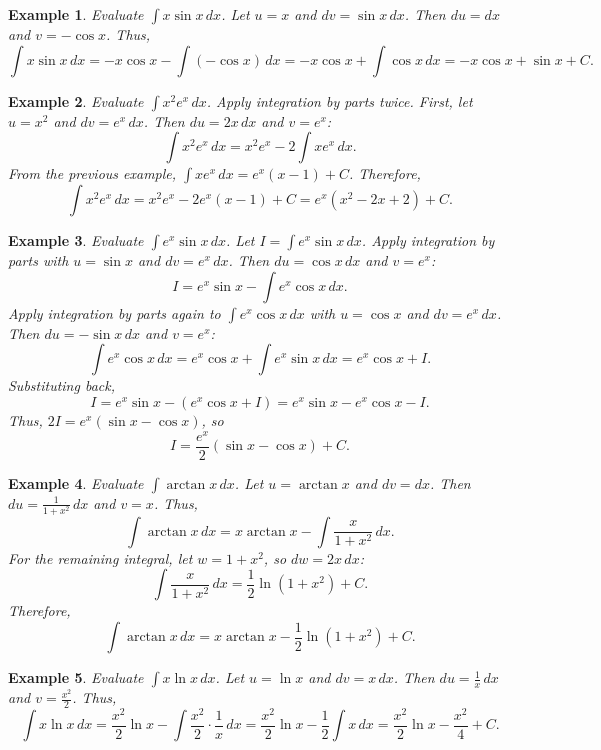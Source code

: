 \documentclass[11pt,a4paper]{article}
\newtheorem{example}{Example}
\begin{document}
\begin{example}
Evaluate $\displaystyle \int x \sin x \, dx$.
Let $u = x$ and $dv = \sin x \, dx$. Then $du = dx$ and $v = -\cos x$. Thus,
\[
\int x \sin x \, dx = -x \cos x - \int (-\cos x) \, dx = -x \cos x + \int \cos x \, dx = -x \cos x + \sin x + C.
\]
\end{example}
\begin{example}
Evaluate $\displaystyle \int x^2 e^x \, dx$.
Apply integration by parts twice. First, let $u = x^2$ and $dv = e^x \, dx$. Then $du = 2x \, dx$ and $v = e^x$:
\[
\int x^2 e^x \, dx = x^2 e^x - 2 \int x e^x \, dx.
\]
From the previous example, $\int x e^x \, dx = e^x(x - 1) + C$. Therefore,
\[
\int x^2 e^x \, dx = x^2 e^x - 2e^x(x - 1) + C = e^x(x^2 - 2x + 2) + C.
\]
\end{example}
\begin{example}
Evaluate $\displaystyle \int e^x \sin x \, dx$.
Let $I = \int e^x \sin x \, dx$. Apply integration by parts with $u = \sin x$ and $dv = e^x \, dx$. Then $du = \cos x \, dx$ and $v = e^x$:
\[
I = e^x \sin x - \int e^x \cos x \, dx.
\]
Apply integration by parts again to $\int e^x \cos x \, dx$ with $u = \cos x$ and $dv = e^x \, dx$. Then $du = -\sin x \, dx$ and $v = e^x$:
\[
\int e^x \cos x \, dx = e^x \cos x + \int e^x \sin x \, dx = e^x \cos x + I.
\]
Substituting back,
\[
I = e^x \sin x - (e^x \cos x + I) = e^x \sin x - e^x \cos x - I.
\]
Thus, $2I = e^x(\sin x - \cos x)$, so
\[
I = \frac{e^x}{2}(\sin x - \cos x) + C.
\]
\end{example}
\begin{example}
Evaluate $\displaystyle \int \arctan x \, dx$.
Let $u = \arctan x$ and $dv = dx$. Then $du = \frac{1}{1+x^2} \, dx$ and $v = x$. Thus,
\[
\int \arctan x \, dx = x \arctan x - \int \frac{x}{1+x^2} \, dx.
\]
For the remaining integral, let $w = 1 + x^2$, so $dw = 2x \, dx$:
\[
\int \frac{x}{1+x^2} \, dx = \frac{1}{2} \ln(1+x^2) + C.
\]
Therefore,
\[
\int \arctan x \, dx = x \arctan x - \frac{1}{2} \ln(1+x^2) + C.
\]
\end{example}
\begin{example}
Evaluate $\displaystyle \int x \ln x \, dx$.
Let $u = \ln x$ and $dv = x \, dx$. Then $du = \frac{1}{x} \, dx$ and $v = \frac{x^2}{2}$. Thus,
\[
\int x \ln x \, dx = \frac{x^2}{2} \ln x - \int \frac{x^2}{2} \cdot \frac{1}{x} \, dx = \frac{x^2}{2} \ln x - \frac{1}{2} \int x \, dx = \frac{x^2}{2} \ln x - \frac{x^2}{4} + C.
\]
\end{example}
\end{document}
